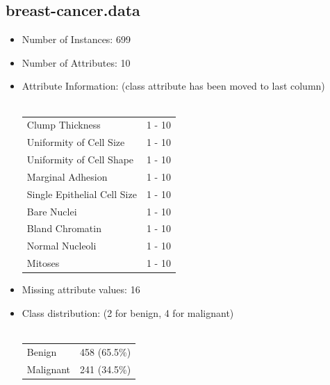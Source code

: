 \documentclass[10pt]{report}
\begin{document}
\subsection*{breast-cancer.data}
\begin{itemize}
\item Number of Instances: 699
\item Number of Attributes: 10
\item Attribute Information: (class attribute has been moved to last column)
  \\\\
  \begin{left}
    \begin{tabular}{ l l }
      Clump Thickness               &  1 - 10  \\
      Uniformity of Cell Size       &  1 - 10  \\
      Uniformity of Cell Shape      &  1 - 10  \\
      Marginal Adhesion             &  1 - 10  \\
      Single Epithelial Cell Size   &  1 - 10  \\
      Bare Nuclei                   &  1 - 10  \\
      Bland Chromatin               &  1 - 10  \\
      Normal Nucleoli               &  1 - 10  \\
      Mitoses                       &  1 - 10  \\
    \end{tabular}
  \end{left}

\item Missing attribute values: 16
\item Class distribution: (2 for benign, 4 for malignant)
  \\\\
  \begin{left}
    \begin{tabular}{ l l }
      Benign       &  458 (65.5\%) \\
      Malignant    &  241 (34.5\%) \\
    \end{tabular}
  \end{left}
\end{itemize}


\end{document}
